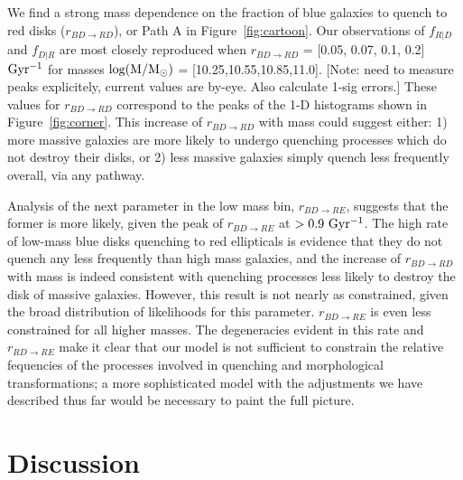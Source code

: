 We find a strong mass dependence on the fraction of blue galaxies to quench to red disks ($r_{BD \rightarrow RD}$), or Path A in Figure~\ref{fig:cartoon}. Our observations of $f_{R|D}$ and $f_{D|R}$ are most closely reproduced when $r_{BD \rightarrow RD}$ = [0.05, 0.07, 0.1, 0.2] $\rm Gyr^{-1}$ for masses $\rm log(M/M_{\odot})$ = [10.25,10.55,10.85,11.0]. [Note: need to measure peaks explicitely, current values are by-eye. Also calculate 1-sig errors.] These values for $r_{BD \rightarrow RD}$ correspond to the peaks of the 1-D histograms shown in Figure~\ref{fig:corner}. This increase of $r_{BD \rightarrow RD}$ with mass could suggest either: 1) more massive galaxies are more likely to undergo quenching processes which do not destroy their disks, or 2) less massive galaxies simply quench less frequently overall, via any pathway. 


 Analysis of the next parameter in the low mass bin, $r_{BD\rightarrow RE}$, suggests that the former is more likely, given the peak of $r_{BD \rightarrow RE}$ at $>0.9 ~\rm Gyr^{-1}$. The high rate of low-mass blue disks quenching to red ellipticals is evidence that they do not quench any less frequently than high mass galaxies, and the increase of $r_{BD \rightarrow RD}$ with mass is indeed consistent with quenching processes less likely to destroy the disk of massive galaxies. However, this result is not nearly as constrained, given the broad distribution of likelihoods for this parameter. $r_{BD \rightarrow RE}$ is even less constrained for all higher masses. The degeneracies evident in this rate and $r_{RD \rightarrow RE}$ make it clear that our model is not sufficient to constrain the relative fequencies of the processes involved in quenching and morphological transformations; a more sophisticated model with the adjustments we have described thus far would be necessary to paint the full picture. 



\section{Discussion}
\label{sec:Discussion}

